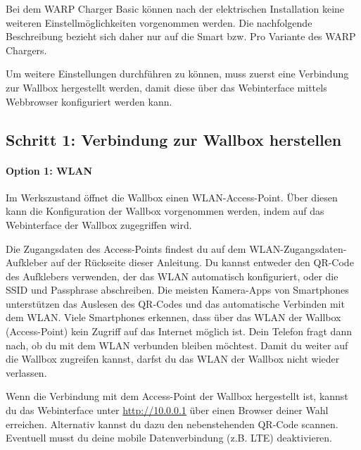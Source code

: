 \documentclass[a4paper,10pt]{article}
\begin{document}
\begin{multicols*}{2}
    Bei dem WARP Charger Basic können nach der elektrischen Installation
    keine weiteren Einstellmöglichkeiten vorgenommen werden. Die nachfolgende
    Beschreibung bezieht sich daher nur auf die Smart bzw. Pro Variante des WARP
    Chargers.

    Um weitere Einstellungen durchführen zu können, muss zuerst eine Verbindung
    zur Wallbox hergestellt werden, damit diese über das Webinterface mittels
	Webbrowser konfiguriert werden kann.

    \subsection{Schritt 1: Verbindung zur Wallbox herstellen}

    \paragraph{Option 1: WLAN}
    Im Werkszustand öffnet die Wallbox einen WLAN-Access-Point. Über diesen kann
    die Konfiguration der Wallbox vorgenommen werden, indem auf das
    Webinterface der Wallbox zugegriffen wird.

    Die Zugangsdaten des Access-Points findest du auf dem WLAN-Zugangsdaten-Aufkleber
    auf der Rückseite dieser Anleitung. Du kannst entweder den QR-Code des Aufklebers verwenden,
    der das WLAN automatisch konfiguriert, oder die SSID und Passphrase abschreiben.
    Die meisten Kamera-Apps von Smartphones unterstützen das Auslesen des
    QR-Codes und das automatische Verbinden mit dem WLAN. Viele Smartphones
    erkennen, dass über das WLAN der Wallbox (Access-Point) kein Zugriff auf das
    Internet möglich ist. Dein Telefon fragt dann nach, ob du mit dem WLAN
    verbunden bleiben möchtest. Damit du weiter auf die Wallbox zugreifen
    kannst, darfst du das WLAN der Wallbox nicht wieder verlassen.

    \begin{minipage}{0.35\textwidth}
        Wenn die Verbindung mit dem Access-Point der Wallbox hergestellt ist, kannst du das Webinterface
        unter \url{http://10.0.0.1} über einen Browser deiner Wahl erreichen.
        Alternativ kannst du dazu den nebenstehenden QR-Code scannen.
        Eventuell musst du deine mobile Datenverbindung (z.B. LTE) deaktivieren.
    \end{minipage}\hfill
    \begin{minipage}{0.12\textwidth}
        \begin{flushright}
        \end{flushright}
    \end{minipage}


\end{multicols*}
\end{document}
